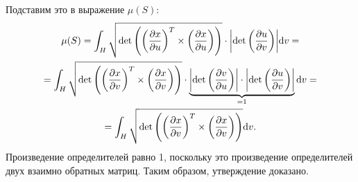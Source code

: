 Подставим это в выражение $\mu(S)$:
\begin{multline}
    \mu(S) = \int_{H} \sqrt{\det\pqty{\pqty{\pdv{x}{u}}^{T} \times \pqty{\pdv{x}{u}}}} \cdot \abs{\det\pqty{\pdv{u}{v}}} \dd v = \\ = \int_{H} \sqrt{\det\pqty{\pqty{\pdv{x}{v}}^{T} \times \pqty{\pdv{x}{v}}}} \cdot \underbrace{\abs{\det\pqty{\pdv{v}{u}}} \cdot \abs{\det\pqty{\pdv{u}{v}}}}_{= 1} \dd v = \\ = \int_{H} \sqrt{\det\pqty{\pqty{\pdv{x}{v}}^{T} \times \pqty{\pdv{x}{v}}}} \dd v.
\end{multline}
Произведение определителей равно 1, поскольку это произведение определителей двух взаимно обратных матриц.
Таким образом, утверждение доказано.
